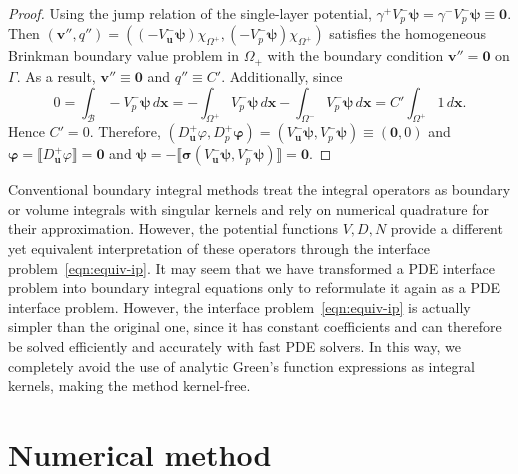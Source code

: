 \documentclass[preprint,11pt]{elsarticle}
\theoremstyle{remark}
\newcommand{\jump}[1]{\llbracket#1\rrbracket}
\newcommand{\mc}[1]{\mathcal{#1}}
\newcommand{\bm}[1]{\boldsymbol{#1}}
\newcommand{\vph}{\varphi}
\begin{document}
\begin{proof}
Using the jump relation of the single-layer potential, $\gamma^+ V_p^-\bm \psi = \gamma^- V_p^-\bm \psi \equiv \bm 0$. Then $(\bm v'', q'')=((-V_{\bm u}^-\bm\psi)\chi_{\Omega^+}, (-V_p^-\bm \psi)\chi_{\Omega^+})$ satisfies the homogeneous Brinkman boundary value problem in $\Omega_+$ with the boundary condition $\bm v'' = \bm 0$ on $\Gamma$. As a result, $\bm v'' \equiv \bm 0$ and $q'' \equiv C'$. Additionally, since 
    \begin{equation}
        0 = \int_{\mc B} -V_p^-\bm \psi\,d\bm x = - \int_{\Omega^+} V_p^-\bm \psi\,d\bm x-\int_{\Omega^-} V_p^-\bm \psi\,d\bm x = C ' \int_{\Omega^+} 1 \,d\bm x.
    \end{equation}
    Hence $C' = 0$.
    Therefore, $(D_{\bm u}^+\vph , D_p^+\bm\vph) = (V_{\bm u}^-\bm\psi , V_p^-\bm \psi) \equiv (\bm 0, 0)$ and $\bm \vph = \jump{D_{\bm u}^+\vph} = \bm 0$ and $\bm \psi = -\jump{\bm\sigma(V_{\bm u}^-\bm\psi, V_p^-\bm\psi)} = \bm 0$.
\end{proof}

Conventional boundary integral methods treat the integral operators as boundary or volume integrals with singular kernels and rely on numerical quadrature for their approximation. However, the potential functions $V, D, N$ provide a different yet equivalent interpretation of these operators through the interface problem~\eqref{eqn:equiv-ip}. It may seem that we have transformed a PDE interface problem into boundary integral equations only to reformulate it again as a PDE interface problem. However, the interface problem~\eqref{eqn:equiv-ip} is actually simpler than the original one, since it has constant coefficients and can therefore be solved efficiently and accurately with fast PDE solvers. In this way, we completely avoid the use of analytic Green's function expressions as integral kernels, making the method kernel-free.


\section{Numerical method}\label{sec4}
\end{document}
